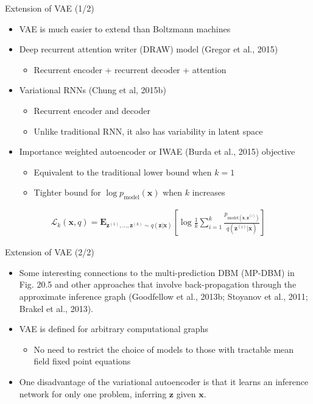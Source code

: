 \documentclass[dvipdfmx,presentation]{beamer}
\def\bf{\mathbf}
\begin{document}
\begin{frame}[label={sec:orgheadline25}]{Extension of VAE (1/2)}
\begin{itemize}
\item VAE is much easier to extend than Boltzmann machines
\item Deep recurrent attention writer (DRAW) model (Gregor et al., 2015)
\begin{itemize}
\item Recurrent encoder + recurrent decoder + attention
\end{itemize}
\item Variational RNNs (Chung et al, 2015b)
\begin{itemize}
\item Recurrent encoder and decoder
\item Unlike traditional RNN, it also has variability in latent space
\end{itemize}
\item Importance weighted autoencoder or IWAE (Burda et al., 2015) objective
\begin{itemize}
\item Equivalent to the traditional lower bound when \(k=1\)
\item Tighter bound for \(\log p_{\mathrm{model}}(\bf{x})\) when \(k\) increases
\end{itemize}
\end{itemize}
\begin{align*}
\mathcal{L}_{k}(\bf{x}, q) = \bf{E}_{\bf{z}^{(1)}, \ldots, \bf{z}^{(k)} \sim q(\bf{z} | \bf{x})}
\left[
\log \frac{1}{k} \sum_{i=1}^{k} \frac{p_{\mathrm{model}(\bf{x}, \bf{z}^{(i)})}}{q(\bf{z}^{(i)} | \bf{x})}
\right]
\end{align*}
\end{frame}

\begin{frame}[label={sec:orgheadline26}]{Extension of VAE (2/2)}
\begin{itemize}
\item Some interesting connections to the multi-prediction DBM (MP-DBM) in Fig. 20.5 and other approaches that involve back-propagation through the approximate inference graph (Goodfellow et al., 2013b; Stoyanov et al., 2011; Brakel et al., 2013).
\item VAE is defined for arbitrary computational graphs
\begin{itemize}
\item No need to restrict the choice of models to those with tractable mean field fixed point equations
\end{itemize}
\item One disadvantage of the variational autoencoder is that it learns an inference network for only one problem, inferring \(\bf{z}\) given \(\bf{x}\).
\end{itemize}
\end{frame}
\end{document}
